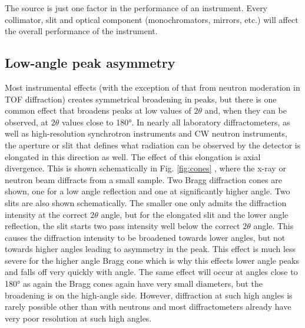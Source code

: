  The source is just one factor in the performance of an instrument. Every collimator, slit and optical component (monochromators, mirrors, etc.) will affect the overall performance of the instrument. 

 

\subsection{Low-angle peak asymmetry}

Most instrumental effects (with the exception of that from neutron moderation in TOF diffraction) creates symmetrical broadening in peaks, but there is one common effect that broadens peaks at low values of $2\theta$ and, when they can be observed, at $2\theta$ values close to 180°. In nearly all laboratory diffractometers, as well as high-resolution synchrotron instruments and CW neutron instruments, the aperture or slit that defines what radiation can be observed by the detector is elongated in this direction as well. The effect of this elongation is axial divergence. This is shown schematically in Fig.     \ref{fig:cones}
, where the x-ray or neutron beam diffracts from a small sample. Two Bragg diffraction cones are shown, one for a low angle reflection and one at significantly higher angle. Two slits are also shown schematically. The smaller one only admits the diffraction intensity at the correct $2\theta$ angle, but for the elongated slit and the lower angle reflection, the slit starts two pass intensity well below the correct $2\theta$ angle. This causes the diffraction intensity to be broadened towards lower angles, but not towards higher angles leading to asymmetry in the peak. This effect is much less severe for the higher angle Bragg cone which is why this effects lower angle peaks and falls off very quickly with angle. The same effect will occur at angles close to 180° as again the Bragg cones again have very small diameters, but the broadening is on the high-angle side. However, diffraction at such high angles is rarely possible other than with neutrons and most diffractometers already have very poor resolution at such high angles. 

